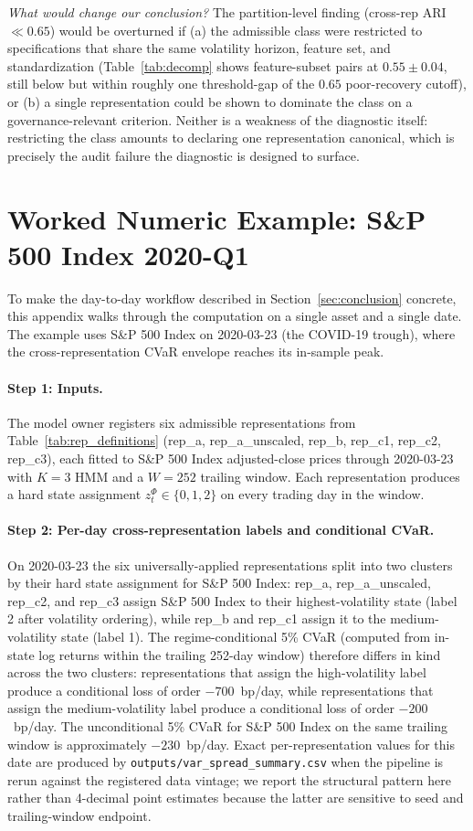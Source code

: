 \documentclass[preprint,12pt,authoryear]{elsarticle}
\newcommand{\SPX}{S\&P 500 Index}
\begin{document}
\emph{What would change our conclusion?} The partition-level finding (cross-rep ARI $\ll 0.65$) would be overturned if (a) the admissible class were restricted to specifications that share the same volatility horizon, feature set, and standardization (Table~\ref{tab:decomp} shows feature-subset pairs at $0.55 \pm 0.04$, still below but within roughly one threshold-gap of the $0.65$ poor-recovery cutoff), or (b) a single representation could be shown to dominate the class on a governance-relevant criterion. Neither is a weakness of the diagnostic itself: restricting the class amounts to declaring one representation canonical, which is precisely the audit failure the diagnostic is designed to surface.

\section{Worked Numeric Example: \SPX{} 2020-Q1}
\label{app:worked_example}

To make the day-to-day workflow described in Section~\ref{sec:conclusion} concrete, this appendix walks through the computation on a single asset and a single date. The example uses \SPX{} on 2020-03-23 (the COVID-19 trough), where the cross-representation CVaR envelope reaches its in-sample peak.

\paragraph{Step 1: Inputs.}
The model owner registers six admissible representations from Table~\ref{tab:rep_definitions} (rep\_a, rep\_a\_unscaled, rep\_b, rep\_c1, rep\_c2, rep\_c3), each fitted to \SPX{} adjusted-close prices through 2020-03-23 with $K=3$ HMM and a $W=252$ trailing window. Each representation produces a hard state assignment $z_t^\Phi \in \{0,1,2\}$ on every trading day in the window.

\paragraph{Step 2: Per-day cross-representation labels and conditional CVaR.}
On 2020-03-23 the six universally-applied representations split into two clusters by their hard state assignment for \SPX{}: rep\_a, rep\_a\_unscaled, rep\_c2, and rep\_c3 assign \SPX{} to their highest-volatility state (label 2 after volatility ordering), while rep\_b and rep\_c1 assign it to the medium-volatility state (label 1). The regime-conditional 5\% CVaR (computed from in-state log returns within the trailing 252-day window) therefore differs in kind across the two clusters: representations that assign the high-volatility label produce a conditional loss of order $-700$~bp/day, while representations that assign the medium-volatility label produce a conditional loss of order $-200$~bp/day. The unconditional 5\% CVaR for \SPX{} on the same trailing window is approximately $-230$~bp/day. Exact per-representation values for this date are produced by \texttt{outputs/var\_spread\_summary.csv} when the pipeline is rerun against the registered data vintage; we report the structural pattern here rather than 4-decimal point estimates because the latter are sensitive to seed and trailing-window endpoint.
\end{document}
